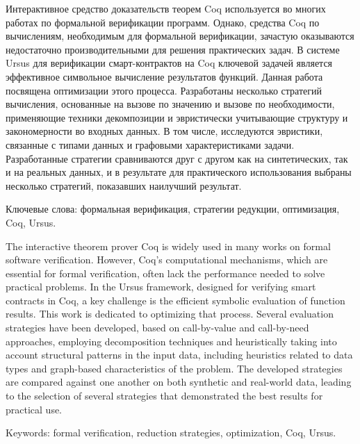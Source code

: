 \documentclass[../thesis.tex]{subfiles}
\begin{document}
Интерактивное средство доказательств теорем Coq используется во многих работах по формальной верификации программ. Однако, средства Coq по вычислениям, необходимым для формальной верификации, зачастую оказываются недостаточно производительными для решения практических задач. В системе Ursus для верификации смарт-контрактов на Coq ключевой задачей является эффективное символьное вычисление результатов функций. Данная работа посвящена оптимизации этого процесса. Разработаны несколько стратегий вычисления, основанные на вызове по значению и вызове по необходимости, применяющие техники декомпозиции и эвристически учитывающие структуру и закономерности во входных данных. В том числе, исследуются эвристики, связанные с типами данных и графовыми характеристиками задачи. Разработанные стратегии сравниваются друг с другом как на синтетических, так и на реальных данных, и в результате для практического использования выбраны несколько стратегий, показавших наилучший результат.

\vspace*{\fill}

Ключевые слова: формальная верификация, стратегии редукции, оптимизация, Coq, Ursus.

\newpage

The interactive theorem prover Coq is widely used in many works on formal software verification. However, Coq's computational mechanisms, which are essential for formal verification, often lack the performance needed to solve practical problems. In the Ursus framework, designed for verifying smart contracts in Coq, a key challenge is the efficient symbolic evaluation of function results. This work is dedicated to optimizing that process. Several evaluation strategies have been developed, based on call-by-value and call-by-need approaches, employing decomposition techniques and heuristically taking into account structural patterns in the input data, including heuristics related to data types and graph-based characteristics of the problem. The developed strategies are compared against one another on both synthetic and real-world data, leading to the selection of several strategies that demonstrated the best results for practical use.

\vspace*{\fill}

Keywords: formal verification, reduction strategies, optimization, Coq, Ursus.
\end{document}
